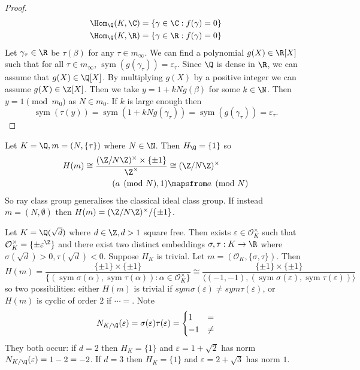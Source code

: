 \documentclass[a4paper]{article}
\renewcommand*{\O}{\mathcal{O}}
\begin{document}
\begin{proof}
  \begin{align*}
    \Hom_\Q(K, \C) &= \{\gamma \in \C: f(\gamma) = 0\} \\
    \Hom_\Q(K, \R) &= \{\gamma \in \R: f(\gamma) = 0\}
  \end{align*}
  Let \(\gamma_\tau \in \R\) be \(\tau(\beta)\) for any \(\tau \in m_\infty\). We can find a polynomial \(g(X) \in \R[X]\) such that for all \(\tau \in m_\infty\), \(\operatorname{sym}(g(\gamma_\tau)) = \varepsilon_\tau\). Since \(\Q\) is dense in \(\R\), we can assume that \(g(X) \in \Q[X]\). By multiplying \(g(X)\) by a positive integer we can assume \(g(X) \in \Z[X]\). Then we take \(y = 1 + kNg(\beta)\) for some \(k \in \N\). Then \(y = 1 \pmod{m_0}\) as \(N \in m_0\). If \(k\) is large enough then
  \[
    \operatorname{sym}(\tau(y)) = \operatorname{sym}(1 + kN g(\gamma_\tau)) = \operatorname{sym}(g(\gamma_\tau)) = \varepsilon_\tau.
  \]
\end{proof}

\begin{eg}
  Let \(K = \Q, m = (N, \{\tau\})\) where \(N \in \N\). Then \(H_\Q = \{1\}\) so
  \begin{align*}
    H(m) \cong \frac{(\Z/N\Z)^\times \times \{\pm 1\}}{\Z^\times} &\cong (\Z/N\Z)^\times \\
    (a \pmod N, 1) &\mapsfrom a \pmod N
  \end{align*}
  So ray class group generalises the classical ideal class group. If instead \(m = (N, \emptyset)\) then \(H(m) = (\Z/N\Z)^\times/\{\pm 1\}\).
\end{eg}

\begin{eg}
  Let \(K = \Q(\sqrt d)\) where \(d \in \Z, d > 1\) square free. Then exists \(\varepsilon \in \O_K^\times\) such that \(\O_K^\times = \{\pm \varepsilon^\Z\}\) and there exist two distinct embeddings \(\sigma, \tau: K \to \R\) where \(\sigma(\sqrt d) > 0, \tau(\sqrt d) < 0\). Suppose \(H_K\) is trivial. Let \(m = (\O_K, \{\sigma, \tau\})\). Then
  \[
    H(m)
    = \frac{\{\pm 1\} \times \{\pm 1\}}{\{(\operatorname{sym} \sigma(\alpha), \operatorname{sym} \tau(\alpha)): \alpha \in \O_K^\times\}}
    \cong \frac{\{\pm 1\} \times \{\pm 1\}}{\langle (-1, -1), (\operatorname{sym} \sigma(\varepsilon), \operatorname{sym} \tau(\varepsilon)) \rangle}
  \]
  so two possibilities: either \(H(m)\) is trivial if \(sym \sigma(\varepsilon) \neq sym \tau(\varepsilon)\), or \(H(m)\) is cyclic of order \(2\) if \(\cdots =\). Note
  \[
    N_{K/\Q}(\varepsilon) = \sigma(\varepsilon) \tau(\varepsilon) =
    \begin{cases}
      1 & = \\
      -1 & \ne
    \end{cases}
  \]
  They both occur: if \(d = 2\) then \(H_K = \{1\}\) and \(\varepsilon = 1 + \sqrt 2\) has norm \(N_{K/\Q}(\varepsilon) = 1 - 2 = -2\). If \(d = 3\) then \(H_K = \{1\}\) and \(\varepsilon = 2 + \sqrt 3\) has norm \(1\).
\end{eg}





\printindex
\end{document}
